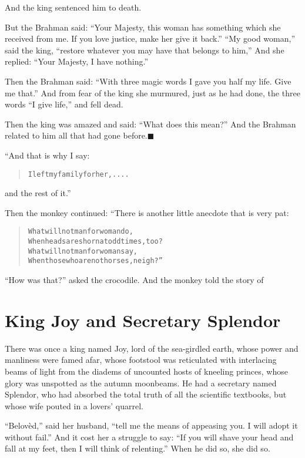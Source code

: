 \documentclass[article, twoside, 14pt]{memoir}
\newcommand{\qed}{\hfill \ensuremath{\blacksquare}}
\renewenvironment{verbatim}{%
\begin{quote}%
\vskip -10pt%
\begin{alltt}\normalfont\large}{\end{alltt}%
\end{quote}%
\vskip -10pt
} %
\begin{document}
And the king sentenced him to death.

But the Brahman said:
``Your Majesty, this woman has something which she received from me. If you love justice, make her give it back.''
``My good woman,'' said the king,
``restore whatever you may have that belongs to him,'' And she
replied: ``Your Majesty, I have nothing.''

Then the Brahman said:
``With three magic words I gave you half my life. Give me that.''
And from fear of the king she murmured, just as he had done, the
three words ``I give life,'' and fell dead.

Then the king was amazed and said: ``What does this mean?'' And the
Brahman related to him all that had gone
before.\hyperref[s71]{\qed}

“And that is why I say:

\begin{verbatim}
I left my family for her, ....
\end{verbatim}
and the rest of it.”

Then the monkey continued: “There is another little anecdote that
is very pat:

\begin{verbatim}
What will not man for woman do,
When heads are shorn{\textemdash}at odd times, too?
What will not man for woman say,
When those who are not horses, neigh?”
\end{verbatim}
``How was that?'' asked the crocodile. And the monkey told the
story of

\chapter{King Joy and Secretary Splendor}

\label{s72}

There was once a king named Joy, lord of the sea-girdled earth,
whose power and manliness were famed afar, whose footstool was
reticulated with interlacing beams of light from the diadems of
uncounted hosts of kneeling princes, whose glory was unspotted as
the autumn moonbeams. He had a secretary named Splendor, who had
absorbed the total truth of all the scientific textbooks, but whose
wife pouted in a lovers' quarrel.

``Belovèd,'' said her husband,
``tell me the means of appeasing you. I will adopt it without fail.''
And it cost her a struggle to say:
``If you will shave your head and fall at my feet, then I will think of relenting.''
When he did so, she did so.
\end{document}
